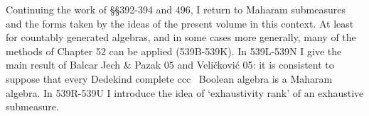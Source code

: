 
\def\chaptername{Topologies and measures III}
\def\sectionname{Maharam submeasures}


Continuing the work of \S\S392-394 %
and 496, I return to Maharam
submeasures and the forms taken by the ideas of the present volume in this
context.   At least for countably generated algebras, and in some cases
more generally, many of the methods of Chapter 52 can be applied
(539B-539K). %
In 539L-539N  %
I give the main result of {\smc Balcar Jech \& Pazak 05} and
{\smc Veli\v{c}kovi\'c 05}:  it is consistent
to suppose that every Dedekind complete ccc \wsid\ Boolean algebra is a
Maharam algebra.   In 539R-539U %
I introduce the idea of `exhaustivity rank' of an exhaustive submeasure.

